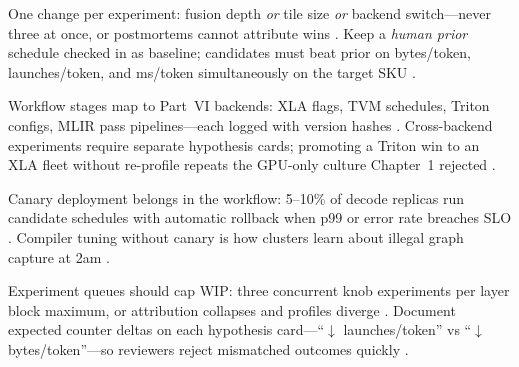 One change per experiment: fusion depth \emph{or} tile size \emph{or} backend switch---never three at once, or postmortems cannot attribute wins \citep{chen2020compilerbasedhardw,yirage2026,patel2025llminference}. Keep a \emph{human prior} schedule checked in as baseline; candidates must beat prior on bytes/token, launches/token, and ms/token simultaneously on the target SKU \citep{memoryfloor2026,taxbreak2026,patel2025llminference,dao2022flashattention,semianalysis2024tma,amd2024xdna,amd2024aie,dlbook,kwon2023vllm,liu2024deepseekv3,dao2023flashdecoding,nvidia2024cudagraphs,nvidia2022hopper,yirage2026,chen2020compilerbasedhardw}.

Workflow stages map to Part~VI backends: XLA flags, TVM schedules, Triton configs, MLIR pass pipelines---each logged with version hashes \citep{chen2020compilerbasedhardw,yirage2026,semianalysis2024tma,amd2024xdna}. Cross-backend experiments require separate hypothesis cards; promoting a Triton win to an XLA fleet without re-profile repeats the GPU-only culture Chapter~1 rejected \citep{patel2025llminference,taxbreak2026,memoryfloor2026,amd2024aie,dlbook,kwon2023vllm,liu2024deepseekv3,dao2022flashattention,dao2023flashdecoding,nvidia2024cudagraphs,nvidia2022hopper,yirage2026,chen2020compilerbasedhardw,amd2024xdna}.

Canary deployment belongs in the workflow: 5--10\% of decode replicas run candidate schedules with automatic rollback when p99 or error rate breaches SLO \citep{patel2025llminference,kwon2023vllm,liu2024deepseekv3,yirage2026,memoryfloor2026,taxbreak2026,chen2020compilerbasedhardw,amd2024aie,dlbook,semianalysis2024tma,amd2024xdna,dao2022flashattention,dao2023flashdecoding,nvidia2024cudagraphs,nvidia2022hopper}. Compiler tuning without canary is how clusters learn about illegal graph capture at 2am \citep{nvidia2024cudagraphs,memoryfloor2026,patel2025llminference,yirage2026,chen2020compilerbasedhardw,taxbreak2026,kwon2023vllm,liu2024deepseekv3,amd2024aie,dlbook,semianalysis2024tma,amd2024xdna,dao2022flashattention,dao2023flashdecoding,nvidia2022hopper}.

Experiment queues should cap WIP: three concurrent knob experiments per layer block maximum, or attribution collapses and profiles diverge \citep{chen2020compilerbasedhardw,yirage2026,patel2025llminference,memoryfloor2026,taxbreak2026,kwon2023vllm,liu2024deepseekv3,amd2024aie,dlbook,semianalysis2024tma,amd2024xdna,dao2022flashattention,dao2023flashdecoding,nvidia2024cudagraphs,nvidia2022hopper}. Document expected counter deltas on each hypothesis card---``$\downarrow$ launches/token'' vs ``$\downarrow$ bytes/token''---so reviewers reject mismatched outcomes quickly \citep{taxbreak2026,memoryfloor2026,patel2025llminference,yirage2026,chen2020compilerbasedhardw,amd2024aie,dlbook,kwon2023vllm,liu2024deepseekv3,semianalysis2024tma,amd2024xdna,dao2022flashattention,dao2023flashdecoding,nvidia2024cudagraphs,nvidia2022hopper}.

